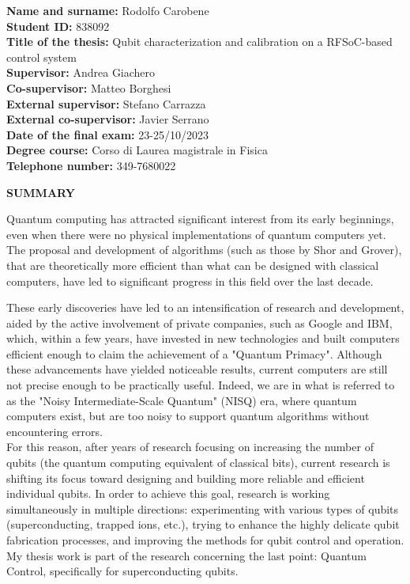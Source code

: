 \documentclass{article}
\begin{document}
\textbf{Name and surname: } Rodolfo Carobene\\
\textbf{Student ID: } 838092\\
\textbf{Title of the thesis: } Qubit characterization and calibration on a RFSoC-based control system\\
\textbf{Supervisor: } Andrea Giachero\\
\textbf{Co-supervisor: } Matteo Borghesi\\
\textbf{External supervisor: } Stefano Carrazza\\
\textbf{External co-supervisor: } Javier Serrano\\
\textbf{Date of the final exam: }23-25/10/2023\\
\textbf{Degree course: } Corso di Laurea magistrale in Fisica\\
\textbf{Telephone number: } 349-7680022\\

\begin{center}
    \textbf{SUMMARY}
\end{center} 

Quantum computing has attracted significant interest from its early beginnings, even when there were no physical implementations of quantum computers yet.
The proposal and development of algorithms (such as those by Shor and Grover), that are theoretically more efficient than what can be designed with classical computers, have led to significant progress in this field over the last decade.


These early discoveries have led to an intensification of research and development, aided by the active involvement of private companies, such as Google and IBM, which, within a few years, have invested in new technologies and built computers efficient enough to claim the achievement of a "Quantum Primacy".
%
Although these advancements have yielded noticeable results, current computers are still not precise enough to be practically useful.
Indeed, we are in what is referred to as the "Noisy Intermediate-Scale Quantum" (NISQ) era, where quantum computers exist, but are too noisy to support quantum algorithms without encountering errors.\\
%
For this reason, after years of research focusing on increasing the number of qubits (the quantum computing equivalent of classical bits), current research is shifting its focus toward designing and building more reliable and efficient individual qubits.
%
In order to achieve this goal, research is working simultaneously in multiple directions: experimenting with various types of qubits (superconducting, trapped ions, etc.), trying to enhance the highly delicate qubit fabrication processes, and improving the methods for qubit control and operation.\\
%
My thesis work is part of the research concerning the last point: Quantum Control, specifically for superconducting qubits.
\end{document}

